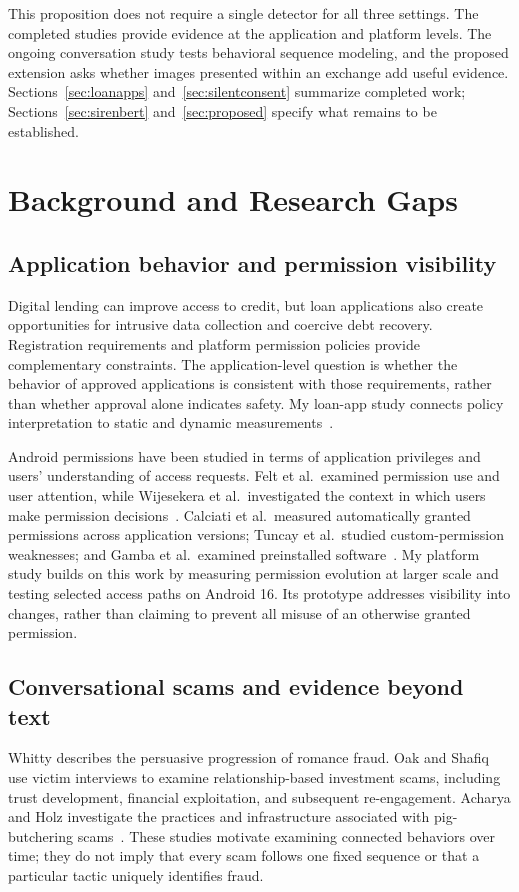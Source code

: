 \documentclass[letterpaper,11pt]{article}
\begin{document}
This proposition does not require a single detector for all three settings.
The completed studies provide evidence at the application and platform levels.
The ongoing conversation study tests behavioral sequence modeling, and the
proposed extension asks whether images presented within an exchange add useful
evidence. Sections~\ref{sec:loanapps} and~\ref{sec:silentconsent} summarize completed
work; Sections~\ref{sec:sirenbert} and~\ref{sec:proposed} specify what remains to be
established.

\section{Background and Research Gaps}
\label{sec:background}
\subsection{Application behavior and permission visibility}
Digital lending can improve access to credit, but loan applications also create
opportunities for intrusive data collection and coercive debt recovery.
Registration requirements and platform permission policies provide complementary
constraints. The application-level question is whether the behavior of approved
applications is consistent with those requirements, rather than whether approval
alone indicates safety. My loan-app study connects policy interpretation to
static and dynamic measurements~\cite{akanji2026cost}.

Android permissions have been studied in terms of application privileges and
users' understanding of access requests. Felt et al.\ examined permission use
and user attention, while Wijesekera et al.\ investigated the context in which
users make permission decisions~\cite{felt2011demystified,felt2012attention,wijesekera2015remystified}.
Calciati et al.\ measured automatically granted permissions across application
versions; Tuncay et al.\ studied custom-permission weaknesses; and Gamba et al.\
examined preinstalled software~\cite{calciati2020automatically,tuncay2018custom,gamba2020preinstalled}.
My platform study builds on this work by measuring permission evolution at larger
scale and testing selected access paths on Android 16. Its prototype addresses
visibility into changes, rather than claiming to prevent all misuse of an
otherwise granted permission.

\subsection{Conversational scams and evidence beyond text}
Whitty describes the persuasive progression of romance fraud. Oak and Shafiq
use victim interviews to examine relationship-based investment scams, including
trust development, financial exploitation, and subsequent re-engagement.
Acharya and Holz investigate the practices and infrastructure associated with
pig-butchering scams~\cite{whitty2013scammers,oak2025anna,acharya2024explorative}.
These studies motivate examining connected behaviors over time; they do not
imply that every scam follows one fixed sequence or that a particular tactic
uniquely identifies fraud.
\end{document}

